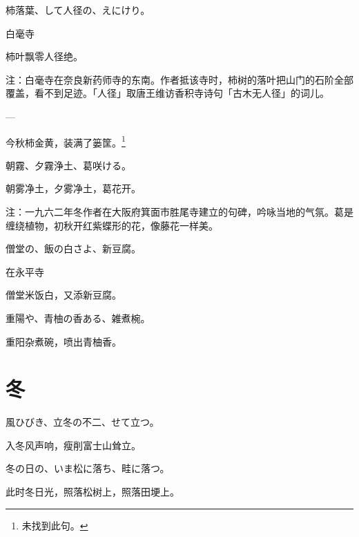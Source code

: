 \begin{haiku}
    {\FH 柿落葉、して人径の、えにけり。}

    {\FK 白毫寺}

    {\FK 柿叶飘零人径绝。}

    {\FT 注：白毫寺在奈良新药师寺的东南。作者抵该寺时，柿树的落叶把山门的石阶全部覆盖，看不到足迹。「人径」取唐王维访香积寺诗句「古木无人径」的词儿。}
\end{haiku}

\begin{haiku}
    {\FH ---}

    {\FK 今秋柿金黄，装满了篓筐。\footnote{\FT 未找到此句。}}
\end{haiku}

\begin{haiku}
    {\FH 朝霧、夕霧浄土、葛咲ける。}

    {\FK 朝雾净土，夕雾净土，葛花开。}

    {\FT 注：一九六二年冬作者在大阪府箕面市胜尾寺建立的句碑，吟咏当地的气氛。葛是缠绕植物，初秋开红紫蝶形的花，像藤花一样美。}
\end{haiku}

\begin{haiku}
    {\FH 僧堂の、飯の白さよ、新豆腐。}

    {\FK 在永平寺}

    {\FK 僧堂米饭白，又添新豆腐。}
\end{haiku}

\begin{haiku}
    {\FH 重陽や、青柚の香ある、雑煮椀。}

    {\FK 重阳杂煮碗，喷出青柚香。}
\end{haiku}

\section{\FK 冬}

\setcounter{haikucounter}{0}

\begin{haiku}
    {\FH 風ひびき、立冬の不二、せて立つ。}

    {\FK 入冬风声响，瘦削富士山耸立。}
\end{haiku}

\begin{haiku}
    {\FH 冬の日の、いま松に落ち、畦に落つ。}

    {\FK 此时冬日光，照落松树上，照落田埂上。}
\end{haiku}

